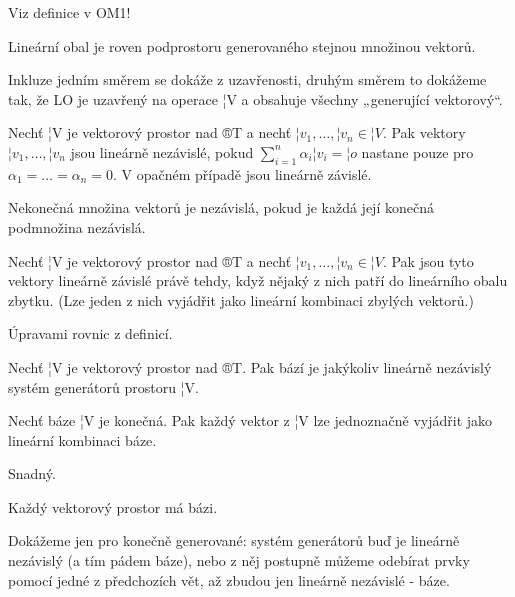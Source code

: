 \documentclass[12pt]{article}					%
\begin{document}
    \begin{definice}
        Viz definice v OM1!
    \end{definice}

    \begin{veta}
        Lineární obal je roven podprostoru generovaného stejnou množinou vektorů.

        \begin{dukazin}
            Inkluze jedním směrem se dokáže z uzavřenosti, druhým směrem to dokážeme tak, že LO je uzavřený na operace ¦V a obsahuje všechny „generující vektorový“.
        \end{dukazin}
    \end{veta}

    \begin{definice}
        Nechť ¦V je vektorový prostor nad ®T a nechť $¦v_1, …, ¦v_n \in ¦V$. Pak vektory $¦v_1, …, ¦v_n$ jsou lineárně nezávislé, pokud $\sum_{i=1}^n \alpha_i ¦v_i = ¦o$ nastane pouze pro $\alpha_1 = … = \alpha_n = 0$. V opačném případě jsou lineárně závislé.
    \end{definice}

    \begin{definice}
        Nekonečná množina vektorů je nezávislá, pokud je každá její konečná podmnožina nezávislá.
    \end{definice}

    \begin{veta}
        Nechť ¦V je vektorový prostor nad ®T a nechť $¦v_1, …, ¦v_n \in ¦V$. Pak jsou tyto vektory lineárně závislé právě tehdy, když nějaký z nich patří do lineárního obalu zbytku. (Lze jeden z nich vyjádřit jako lineární kombinaci zbylých vektorů.)
        \begin{dukazin}
            Úpravami rovnic z definicí.
        \end{dukazin}
    \end{veta}

    \begin{definice}
        Nechť ¦V je vektorový prostor nad ®T. Pak bází je jakýkoliv lineárně nezávislý systém generátorů prostoru ¦V.
    \end{definice}

    \begin{veta}
        Nechť báze ¦V je konečná. Pak každý vektor z ¦V lze jednoznačně vyjádřit jako lineární kombinaci báze.
        \begin{dukazin}
            Snadný.
        \end{dukazin}
    \end{veta}

    \begin{veta}
        Každý vektorový prostor má bázi.

        \begin{dukazin}
            Dokážeme jen pro konečně generované: systém generátorů buď je lineárně nezávislý (a tím pádem báze), nebo z něj postupně můžeme odebírat prvky pomocí jedné z předchozích vět, až zbudou jen lineárně nezávislé - báze.
        \end{dukazin}
    \end{veta}
\end{document}

